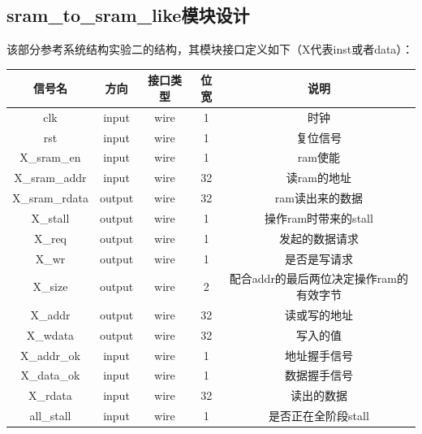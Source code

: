 \subsection{sram\_to\_sram\_like模块设计}

该部分参考系统结构实验二的结构，其模块接口定义如下（X代表inst或者data）：
\begin{table}[H]
    \centering
    \begin{tabular}{ccccc}
        \hline
        信号名 & 方向 & 接口类型 & 位宽 & 说明 \\\hline
        clk & input & wire & 1 & 时钟 \\ 
        rst & input & wire & 1 & 复位信号 \\ 
        X\_sram\_en & input & wire & 1 & ram使能 \\ 
        X\_sram\_addr & input & wire & 32 & 读ram的地址 \\ 
        X\_sram\_rdata & output & wire & 32 & ram读出来的数据 \\  
        X\_stall & output & wire & 1 & 操作ram时带来的stall \\  
        X\_req & output & wire & 1 & 发起的数据请求 \\ 
        X\_wr & output & wire & 1 & 是否是写请求 \\ 
        X\_size & output & wire & 2 & 配合addr的最后两位决定操作ram的有效字节 \\ 
        X\_addr & output & wire & 32 & 读或写的地址 \\ 
        X\_wdata & output & wire & 32 & 写入的值 \\ 
        X\_addr\_ok & input & wire & 1 & 地址握手信号 \\ 
        X\_data\_ok & input & wire & 1 & 数据握手信号 \\ 
        X\_rdata & input & wire & 32 & 读出的数据 \\ 
        all\_stall & input & wire & 1 & 是否正在全阶段stall \\ 

        \hline
    \end{tabular}
\end{table}

